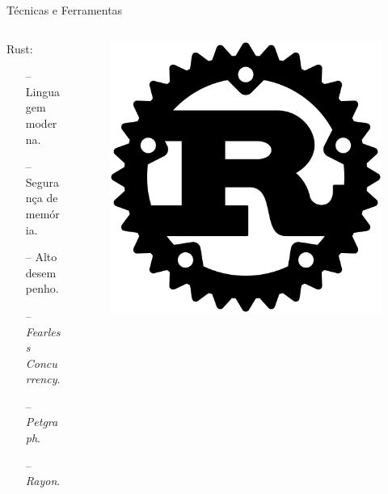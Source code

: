 \begin{frame}{Técnicas e Ferramentas}
    \begin{columns}
    \begin{column}{0.9\textwidth}
    Rust:
    \begin{itemize}
        \item[--] Linguagem moderna.
        \item[--] Segurança de memória.
        \item[--] Alto desempenho. 
        \item[--] \textit{Fearless Concurrency}.
        \item[--] \textit{Petgraph}.
        \item[--] \textit{Rayon}.
    \end{itemize}
    \end{column}

    \begin{column}{0.1\textwidth}
        \begin{figure}
            \includegraphics[width=\textwidth]{Figuras/Rust Logo.svg.png}
        \end{figure}
    \end{column}
    \end{columns}
\end{frame}

